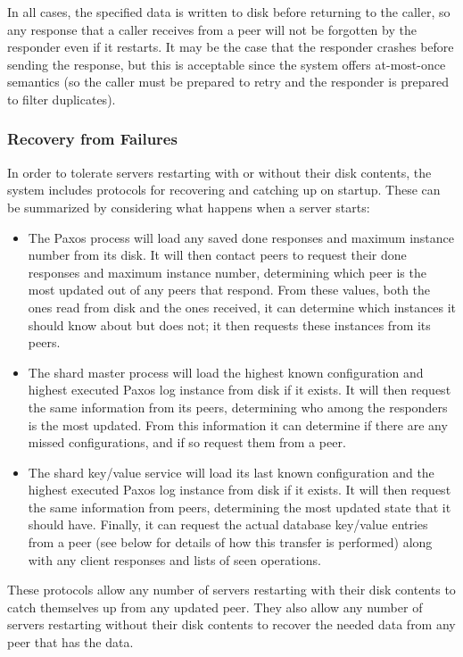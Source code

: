 \documentclass[letterpaper,10pt]{article}
\begin{document}
In all cases, the specified data is written to disk before returning to the caller, so any response that a caller receives from a peer will not be forgotten by the responder even if it restarts.  It may be the case that the responder crashes before sending the response, but this is acceptable since the system offers at-most-once semantics (so the caller must be prepared to retry and the responder is prepared to filter duplicates).

\subsubsection{Recovery from Failures}
In order to tolerate servers restarting with or without their disk contents, the system includes protocols for recovering and catching up on startup.  These can be summarized by considering what happens when a server starts:

\begin{itemize}
\item The Paxos process will load any saved done responses and maximum instance number from its disk.   It will then contact peers to request their done responses and maximum instance number, determining which peer is the most updated out of any peers that respond.  From these values, both the ones read from disk and the ones received, it can determine which instances it should know about but does not; it then requests these instances from its peers.
\item The shard master process will load the highest known configuration and highest executed Paxos log instance from disk if it exists.  It will then request the same information from its peers, determining who among the responders is the most updated.  From this information it can determine if there are any missed configurations, and if so request them from a peer.  
\item The shard key/value service will load its last known configuration and the highest executed Paxos log instance from disk if it exists.  It will then request the same information from peers, determining the most updated state that it should have.  Finally, it can request the actual database key/value entries from a peer (see below for details of how this transfer is performed) along with any client responses and lists of seen operations.
\end{itemize}
These protocols allow any number of servers restarting with their disk contents to catch themselves up from any updated peer.  They also allow any number of servers restarting without their disk contents to recover the needed data from any peer that has the data.
\end{document}
